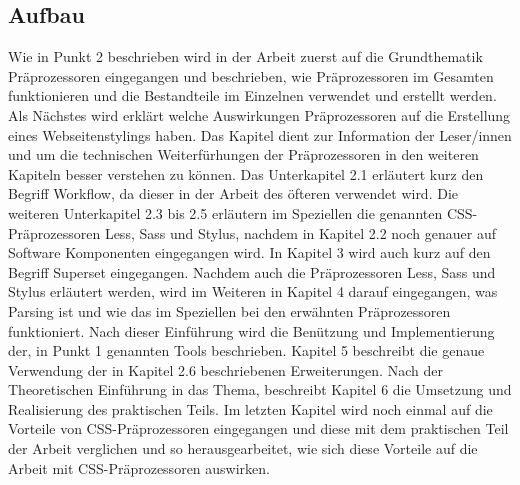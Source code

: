 \subsection{Aufbau}
Wie in Punkt 2 beschrieben wird in der Arbeit zuerst auf die Grundthematik Präprozessoren eingegangen und beschrieben, wie Präprozessoren im Gesamten funktionieren und die Bestandteile im Einzelnen verwendet und erstellt werden.\newline
Als Nächstes wird erklärt welche Auswirkungen Präprozessoren auf die Erstellung eines Webseitenstylings haben. Das Kapitel dient zur Information der Leser/innen und um die technischen Weiterfürhungen der Präprozessoren in den weiteren Kapiteln besser verstehen zu können.\newline
Das Unterkapitel 2.1 erläutert kurz den Begriff Workflow, da dieser in der Arbeit des öfteren verwendet wird.\newline
Die weiteren Unterkapitel 2.3 bis 2.5 erläutern im Speziellen die genannten CSS-Präprozessoren Less, Sass und Stylus, nachdem in Kapitel 2.2 noch genauer auf Software Komponenten eingegangen wird.\newline 
In Kapitel 3 wird auch kurz auf den Begriff Superset eingegangen.\newline
Nachdem auch die Präprozessoren Less, Sass und Stylus erläutert werden, wird im Weiteren in Kapitel 4 darauf eingegangen, was Parsing ist und wie das im Speziellen bei den erwähnten Präprozessoren funktioniert.\newline
Nach dieser Einführung wird die Benützung und Implementierung der, in Punkt 1 genannten Tools beschrieben. \newline
Kapitel 5 beschreibt die genaue Verwendung der in Kapitel 2.6 beschriebenen Erweiterungen.
Nach der Theoretischen Einführung in das Thema, beschreibt Kapitel 6 die Umsetzung und Realisierung des praktischen Teils.\newline
Im letzten Kapitel wird noch einmal auf die Vorteile von CSS-Präprozessoren eingegangen und diese mit dem praktischen Teil der Arbeit verglichen und so herausgearbeitet, wie sich diese Vorteile auf die Arbeit mit CSS-Präprozessoren auswirken.
\newpage
